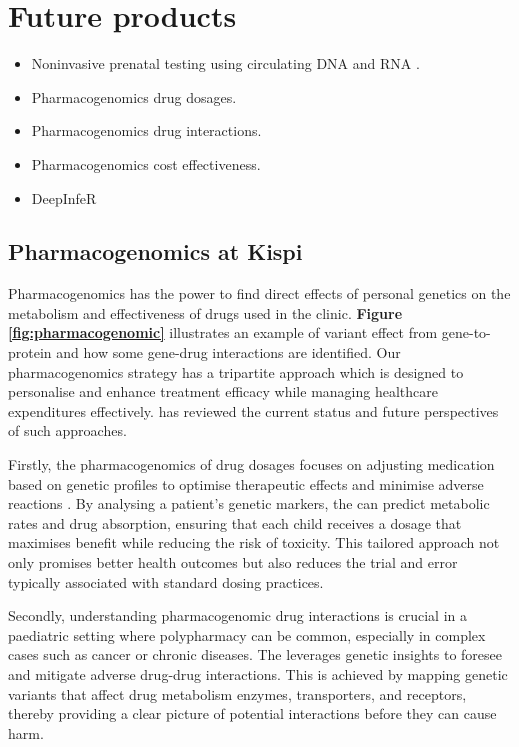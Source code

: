 \section{Future products}

\begin{itemize}
\item Noninvasive prenatal testing using circulating DNA and RNA 
\citep{moufarrej2023noninvasive}.
\item Pharmacogenomics drug dosages.
\item Pharmacogenomics drug interactions.
\item Pharmacogenomics cost effectiveness.
\item DeepInfeR
\end{itemize}


\subsection{Pharmacogenomics at Kispi}

Pharmacogenomics has the power to find direct effects of personal genetics on the metabolism and effectiveness of drugs used in the clinic. 
\textbf{Figure
\ref{fig:pharmacogenomic}}
illustrates an example of variant effect from gene-to-protein and how some gene-drug interactions are identified. 
Our pharmacogenomics strategy has a tripartite approach which is designed to personalise and enhance treatment efficacy while managing healthcare expenditures effectively.
\citet{pirmohamed2023pharmacogenomics} has reviewed the current status and future perspectives of such approaches.

Firstly, the pharmacogenomics of drug dosages focuses on adjusting medication based on genetic profiles to optimise therapeutic effects and minimise adverse reactions 
\citep{yip2015pharmacogenetic}.
By analysing a patient's genetic markers, the \pmu can predict metabolic rates and drug absorption, ensuring that each child receives a dosage that maximises benefit while reducing the risk of toxicity. 
This tailored approach not only promises better health outcomes but also reduces the trial and error typically associated with standard dosing practices.

Secondly, understanding pharmacogenomic drug interactions is crucial in a paediatric setting where polypharmacy can be common, especially in complex cases such as cancer or chronic diseases. 
The \pmu leverages genetic insights to foresee and mitigate adverse drug-drug interactions. 
This is achieved by mapping genetic variants that affect drug metabolism enzymes, transporters, and receptors, thereby providing a clear picture of potential interactions before they can cause harm.

